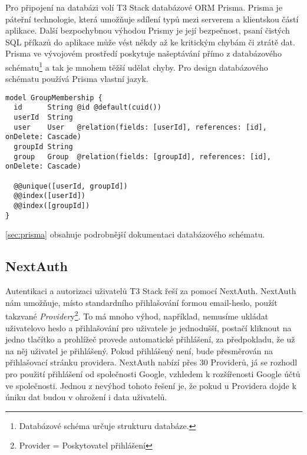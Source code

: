 Pro připojení na databázi volí T3 Stack databázové ORM Prisma. Prisma je páteřní technologie, která umožňuje sdílení typů mezi serverem a klientskou částí aplikace. Další bezpochybnou výhodou Prismy je její bezpečnost, psaní čistých SQL příkazů do aplikace může vést někdy až ke kritickým chybám či ztrátě dat. Prisma ve vývojovém prostředí poskytuje našeptávání přímo z databázového schématu\footnote{Databázové schéma určuje strukturu databáze.} a tak je mnohem těžší udělat chyby.
Pro design databázového schématu používá Prisma vlastní jazyk.

\begin{lstlisting}[language=Prisma, caption={Úryvek z Databázové schématu zobrazující strukturu tabulky pro členství ve skupině}]
model GroupMembership {
  id      String @id @default(cuid())
  userId  String
  user    User   @relation(fields: [userId], references: [id], onDelete: Cascade)
  groupId String
  group   Group  @relation(fields: [groupId], references: [id], onDelete: Cascade)

  @@unique([userId, groupId])
  @@index([userId])
  @@index([groupId])
}
\end{lstlisting}

\autoref{sec:prisma} obsahuje podrobnější dokumentaci databázového schématu.

\subsection{NextAuth}
Autentikaci a autorizaci uživatelů T3 Stack řeší za pomocí NextAuth. NextAuth nám umožňuje, místo standardního přihlašování formou email-heslo, použít takzvané \textit{Provider}y\footnote{Provider = Poskytovatel přihlášení}.
To má mnoho výhod, například, nemusíme ukládat uživatelovo heslo a přihlašování pro uživatele je jednodušší, postačí kliknout na jedno tlačítko a prohlížeč provede automatické přihlášení, za předpokladu, že už na něj uživatel je přihlášený.
Pokud přihlášený není, bude přesměrován na přihlašovací stránku providera. NextAuth nabízí přes 30 Providerů\cite{next-auth}, já se rozhodl pro použití přihlášení od společnosti Google, vzhledem k rozšířenosti Google účtů ve společnosti. Jednou z nevýhod tohoto řešení je, že pokud u Providera dojde k úniku dat budou v ohrožení i data uživatelů.

